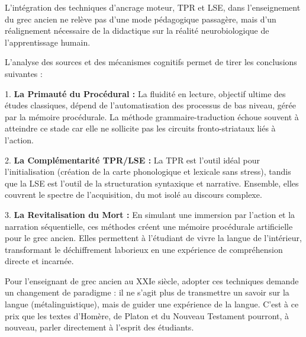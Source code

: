 L'intégration des techniques d'ancrage moteur, TPR et LSE, dans l'enseignement du grec ancien ne
relève pas d'une mode pédagogique passagère, mais d'un réalignement nécessaire de la didactique sur
la réalité neurobiologique de l'apprentissage humain.

L'analyse des sources et des mécanismes cognitifs permet de tirer les conclusions suivantes :

1. \textbf{La Primauté du Procédural :} La fluidité en lecture, objectif ultime des études
classiques, dépend de l'automatisation des processus de bas niveau, gérée par la mémoire
procédurale. La méthode grammaire-traduction échoue souvent à atteindre ce stade car elle ne
sollicite pas les circuits fronto-striataux liés à l'action.

2. \textbf{La Complémentarité TPR/LSE :} La TPR est l'outil idéal pour l'initialisation (création de
la carte phonologique et lexicale sans stress), tandis que la LSE est l'outil de la structuration
syntaxique et narrative. Ensemble, elles couvrent le spectre de l'acquisition, du mot isolé au
discours complexe.

3. \textbf{La Revitalisation du \og Mort\fg{} :} En simulant une immersion par l'action et la
narration séquentielle, ces méthodes créent une \og mémoire procédurale artificielle\fg{} pour le
grec ancien. Elles permettent à l'étudiant de vivre la langue de l'intérieur, transformant le
déchiffrement laborieux en une expérience de compréhension directe et incarnée.

Pour l'enseignant de grec ancien au XXIe siècle, adopter ces techniques demande un changement de
paradigme : il ne s'agit plus de transmettre un savoir sur la langue (métalinguistique), mais de
guider une expérience de la langue. C'est à ce prix que les textes d'Homère, de Platon et du Nouveau
Testament pourront, à nouveau, parler directement à l'esprit des étudiants.

